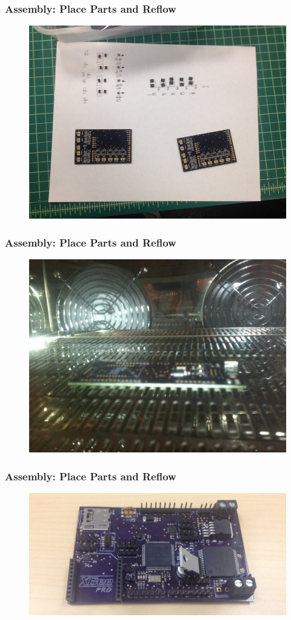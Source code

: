 \documentclass{beamer}
\begin{document}
\begin{frame}
\frametitle{Assembly: Place Parts and Reflow}
\begin{figure}
\includegraphics[width=0.8\linewidth]{assemble.png}
\end{figure}
\end{frame}


\begin{frame}
\frametitle{Assembly: Place Parts and Reflow}
\begin{figure}
\includegraphics[width=0.8\linewidth]{assemble11.png}
\end{figure}
\end{frame}


\begin{frame}
\frametitle{Assembly: Place Parts and Reflow}
\begin{figure}
\includegraphics[width=0.8\linewidth]{foxcar-built.png}
\end{figure}
\end{frame}
\end{document}
